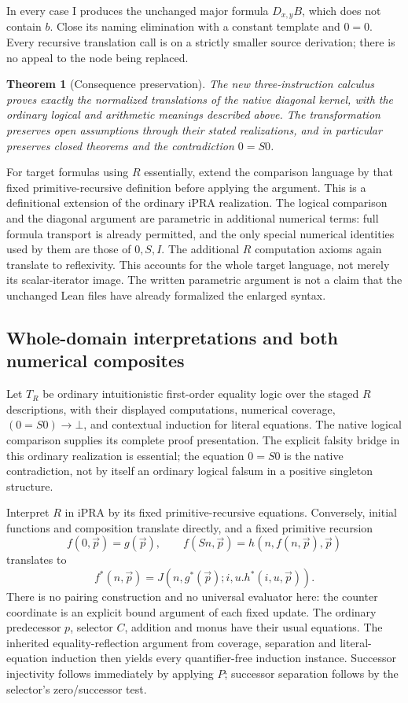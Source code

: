 \documentclass[11pt]{article}
\newtheorem{theorem}{Theorem}[section]
\theoremstyle{definition}\newtheorem{definition}[theorem]{Definition}
\theoremstyle{remark}\newtheorem{remark}[theorem]{Remark}
\begin{document}
In every case I produces the unchanged major formula $D_{x,y}B$, which
does not contain $b$.  Close its naming elimination with a constant
template and $0=0$.  Every recursive translation call is on a strictly
smaller source derivation; there is no appeal to the node being replaced.

\begin{theorem}[Consequence preservation]
The new three-instruction calculus proves exactly the normalized
translations of the native diagonal kernel, with the ordinary logical
and arithmetic meanings described above.  The transformation preserves
open assumptions through their stated realizations, and in particular
preserves closed theorems and the contradiction $0=S0$.
\end{theorem}

For target formulas using $R$ essentially, extend the comparison language
by that fixed primitive-recursive definition before applying the argument.
This is a definitional extension of the ordinary iPRA realization.  The
logical comparison and the diagonal argument are parametric in additional
numerical terms: full formula transport is already permitted, and the only
special numerical identities used by them are those of $0,S,I$.
The additional $R$ computation axioms again translate to reflexivity.
This accounts for the whole target language, not merely its scalar-iterator
image.  The written parametric argument is not a claim that the unchanged
Lean files have already formalized the enlarged syntax.

\subsection{Whole-domain interpretations and both numerical composites}

Let $T_R$ be ordinary intuitionistic first-order equality logic over the
staged $R$ descriptions, with their displayed computations, numerical
coverage, $(0=S0)\to\bot$, and contextual induction for literal equations.
The native logical comparison supplies its complete proof presentation.
The explicit falsity bridge in this ordinary realization is essential;
the equation $0=S0$ is the native contradiction, not by itself an ordinary
logical falsum in a positive singleton structure.

Interpret $R$ in iPRA by its fixed primitive-recursive equations.
Conversely, initial functions and composition translate directly, and a
fixed primitive recursion
\[
 f(0,\vec p)=g(\vec p),\qquad
 f(Sn,\vec p)=h(n,f(n,\vec p),\vec p)
\]
translates to
\[
                f^*(n,\vec p)=J(n,g^*(\vec p);i,u.h^*(i,u,\vec p)).
\]
There is no pairing construction and no universal evaluator here: the
counter coordinate is an explicit bound argument of each fixed update.
The ordinary predecessor $p$, selector $C$, addition and monus have their
usual equations.  The inherited equality-reflection argument from coverage,
separation and literal-equation induction then yields every quantifier-free
induction instance.  Successor injectivity follows immediately by applying
$P$; successor separation follows by the selector's zero/successor test.
\end{document}
